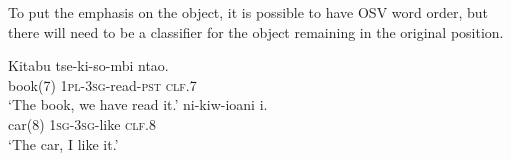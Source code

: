 \documentclass[12pt, oneside]{article}
\begin{document}
To put the emphasis on the object, it is possible to have OSV word order, but there will need to be a classifier for the object remaining in the original position.

\begin{exe}
\ex
\gll Kitabu tse-ki-so-mbi nta\textbeltl o. \\
book(7) \textsc{1pl}-\textsc{3sg}-read-\textsc{pst} \textsc{clf}.7 \\
\trans `The book, we have read it.'
\ex
{} ni-kiw-ioani i. \\
car(8) \textsc{1sg}-\textsc{3sg}-like \textsc{clf}.8 \\
\trans `The car, I like it.'
\end{exe}
\end{document}
